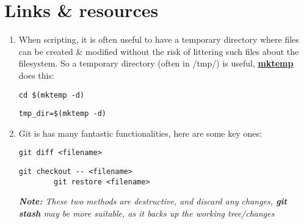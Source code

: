 \documentclass[a4paper]{article}
\newcommand{\note}[1]{\textit{\textbf{Note:} #1}\\}
\begin{document}
\section*{Links \& resources}
\begin{enumerate}

\item When scripting, it is often useful to have a temporary directory where files can be created \& modified without the risk of littering such files about the filesystem. So a temporary directory (often in /tmp/) is useful, \href{https://code-maven.com/create-temporary-directory-on-linux-using-bash}{\textbf{mktemp}} does this:
	\begin{lstlisting}[title=move to the new temporary directory]
	cd $(mktemp -d)
	\end{lstlisting}
	\begin{lstlisting}[title=store the new temporary directory path]
	tmp_dir=$(mktemp -d)
	\end{lstlisting}
	
\item Git is has many fantastic functionalities, here are some key ones:
	\begin{lstlisting}[title=compare working tree with commited version]
		git diff <filename> 
	\end{lstlisting}
	\begin{lstlisting}[title=reset working tree file to the commited version]
		git checkout -- <filename>
		git restore <filename>
	\end{lstlisting}
	\note{These two methods are destructive, and discard any changes, \textbf{git stash} may be more suitable, as it backs up the working tree/changes}
\end{enumerate}
\end{document}
